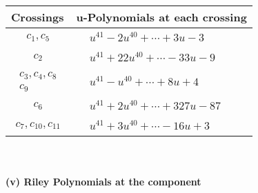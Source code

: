 \documentclass[1p]{elsarticle_modified}
\theoremstyle{definition}
\begin{document}
\begin{tabular}{m{50pt}|m{274pt}}
Crossings & \hspace{64pt}u-Polynomials at each crossing \\
\hline $$\begin{aligned}c_{1},c_{5}\end{aligned}$$&$\begin{aligned}
&u^{41}-2 u^{40}+\cdots+3 u-3
\end{aligned}$\\
\hline $$\begin{aligned}c_{2}\end{aligned}$$&$\begin{aligned}
&u^{41}+22 u^{40}+\cdots-33 u-9
\end{aligned}$\\
\hline $$\begin{aligned}c_{3},c_{4},c_{8}\\c_{9}\end{aligned}$$&$\begin{aligned}
&u^{41}- u^{40}+\cdots+8 u+4
\end{aligned}$\\
\hline $$\begin{aligned}c_{6}\end{aligned}$$&$\begin{aligned}
&u^{41}+2 u^{40}+\cdots+327 u-87
\end{aligned}$\\
\hline $$\begin{aligned}c_{7},c_{10},c_{11}\end{aligned}$$&$\begin{aligned}
&u^{41}+3 u^{40}+\cdots-16 u+3
\end{aligned}$\\
\hline
\end{tabular}\\~\\
\newpage\renewcommand{\arraystretch}{1}
\flushleft \textbf{(v) Riley Polynomials at the component}\newline \\
\end{document}
